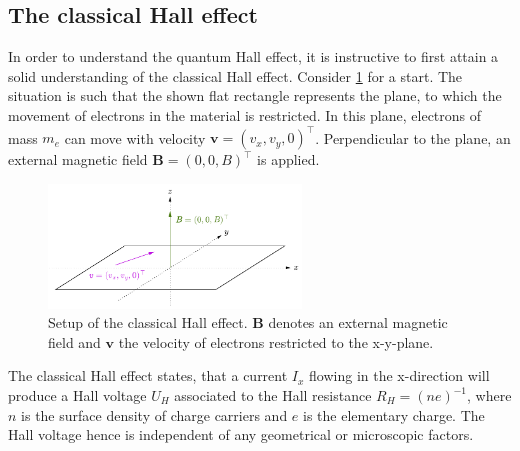 \documentclass{report}
\numberwithin{tm}{section}
\newcommand\vect[1]{\ensuremath{\bm{#1}}}
\begin{document}
	\subsection{The classical Hall effect}
	In order to understand the quantum Hall effect, it is instructive to first attain a solid understanding of the classical Hall effect. Consider \cref{fig:classicalhalleffect} for a start. The situation is such that the shown flat rectangle represents the plane, to which the movement of electrons in the material is restricted. In this plane, electrons of mass $m_e$ can move with velocity $\vect{v} = (v_x,v_y,0)^\top$. Perpendicular to the plane, an external magnetic field $\vect{B} = (0,0,B)^\top$ is applied.
	\begin{figure}[h]
		\centering
		\includegraphics[width=0.6\textwidth]{figures/classicalhalleffect.pdf}
		\caption{Setup of the classical Hall effect. $\vect{B}$ denotes an external magnetic field and $\vect{v}$ the velocity of electrons restricted to the x-y-plane.}
		\label{fig:classicalhalleffect}
	\end{figure}
	The classical Hall effect states, that a current $I_x$ flowing in the x-direction will produce a Hall voltage $U_H$ associated to the Hall resistance $R_H = (ne)^{-1}$, where $n$ is the surface density of charge carriers and $e$ is the elementary charge. The Hall voltage hence is independent of any geometrical or microscopic factors.
	
\end{document}
